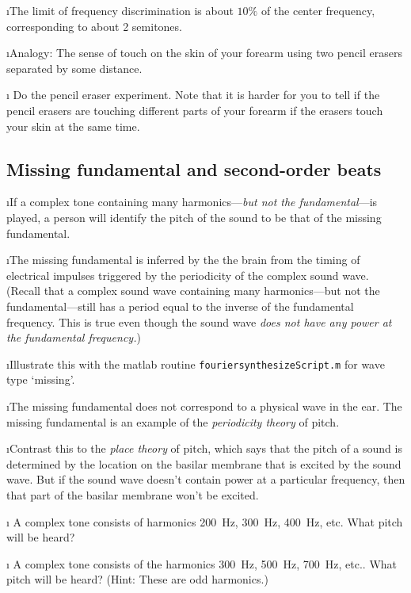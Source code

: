 \i The limit of frequency discrimination 
is about
$10\%$ of the center frequency, corresponding
to about 2 semitones.

\i Analogy: The sense of touch on the skin of 
your forearm using two pencil erasers separated 
by some distance.  

\i \demo 
Do the pencil eraser experiment.
Note that it is harder for you to tell if the pencil 
erasers are touching different parts of your forearm
if the erasers touch your skin at the same time.

\ei

\subsection{Missing fundamental and second-order beats}
\bi

\i If a complex tone containing many 
harmonics---{\em but not the fundamental}---is played, 
a person will identify the pitch of the sound to be 
that of the missing fundamental.

\i The missing fundamental is inferred by the
the brain from the timing of electrical impulses 
triggered by the periodicity of the complex 
sound wave.
(Recall that a complex sound wave containing
many harmonics---but not the fundamental---still 
has a period equal to the inverse of the 
fundamental frequency.
This is true even though the sound wave 
{\em does not have any power at the fundamental 
frequency.})

\i \demo Illustrate this with the matlab routine
{\tt fouriersynthesizeScript.m} for wave type
`missing'.

\i The missing fundamental does not correspond to
a physical wave in the ear.
The missing fundamental is an example of the 
{\em periodicity theory} of pitch. 

\i Contrast this to the {\em place theory} of 
pitch, which says that the pitch of a sound is
determined by the location on the basilar
membrane that is excited by the sound wave.
But if the sound wave doesn't contain power at
a particular frequency, then that part of the
basilar membrane won't be excited.

\i \exer
A complex tone consists of harmonics
200~Hz, 300~Hz, 400~Hz, etc.
What pitch will be heard?

\i \exer
A complex tone consists of the harmonics
300~Hz, 500~Hz, 700~Hz, etc..
What pitch will be heard?
(Hint: These are odd harmonics.)

